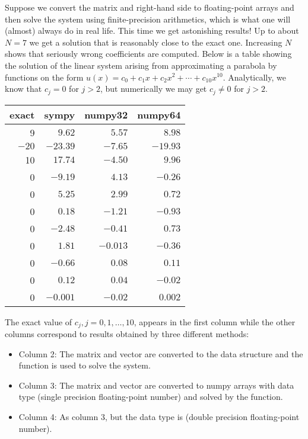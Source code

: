 \documentclass[../main.tex]{subfiles}
\begin{document}
	Suppose we convert the matrix and right-hand side to floating-point arrays and then solve the system using finite-precision arithmetics, which is what one will (almost) always do in real life. This time we get astonishing results! Up to about $N=7$ we get a solution that is reasonably close to the exact one. Increasing $N$ shows that seriously wrong coefficients are computed. Below is a table showing the solution of the linear system arising from approximating a parabola by functions on the form $u(x)=c_{0}+c_{1} x+c_{2} x^{2}+\cdots+c_{10} x^{10}$. Analytically, we know that $c_{j}=0$ for $j>2$, but numerically we may get $c_{j} \neq 0$ for $j>2$.
	
	\begin{tabular}{rrrr}
		\hline exact & sympy & numpy32 & numpy64 \\
		\hline 9 & $9.62$ & $5.57$ & $8.98$ \\
		$-20$ & $-23.39$ & $-7.65$ & $-19.93$ \\
		10 & $17.74$ & $-4.50$ & $9.96$ \\
		0 & $-9.19$ & $4.13$ & $-0.26$ \\
		0 & $5.25$ & $2.99$ & $0.72$ \\
		0 & $0.18$ & $-1.21$ & $-0.93$ \\
		0 & $-2.48$ & $-0.41$ & $0.73$ \\
		0 & $1.81$ & $-0.013$ & $-0.36$ \\
		0 & $-0.66$ & $0.08$ & $0.11$ \\
		0 & $0.12$ & $0.04$ & $-0.02$ \\
		0 & $-0.001$ & $-0.02$ & $0.002$ \\
		\hline
	\end{tabular}
	\bigbreak
	\noindent The exact value of $c_{j}, j=0,1, \ldots, 10$, appears in the first column while the other columns correspond to results obtained by three different methods:
	\begin{itemize}
		\item Column 2: The matrix and vector are converted to the data structure  and the  function is used to solve the system.
		\item Column 3: The matrix and vector are converted to numpy arrays with data type  (single precision floating-point number) and solved by the  function.
		\item Column 4: As column 3, but the data type is  (double precision floating-point number).
	\end{itemize}
	
\end{document}
